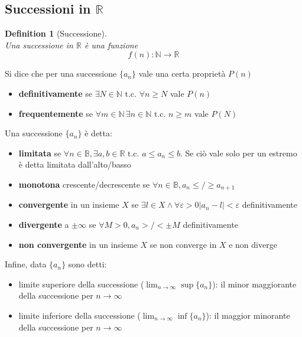 \documentclass{article}
\newtheorem{definition}{Definition}[section]
\begin{document}
    \subsection{Successioni in $\mathbb{R}$}
        \begin{definition}[Successione]
            \, \\ Una successione in $\mathbb{R}$ è una funzione 
            $$f\left(n\right): \mathbb{N} \to \mathbb{R}$$
        \end{definition}
        Si dice che per una successione $\{a_n\}$ vale una certa proprietà $P\left(n\right)$
        \begin{itemize}
            \item \textbf{definitivamente} se $\exists N \in \mathbb{N} \textrm{ t.c. } \forall n \geq N$ vale $P\left(n\right)$
            \item \textbf{frequentemente} se $\forall m \in \mathbb{N} \, \exists n \in \mathbb{N} \textrm{ t.c. } n \geq m$ vale $P\left(N\right)$
        \end{itemize}
        Una successione $\{a_n\}$ è detta:
        \begin{itemize}
            \item \textbf{limitata} se $\forall n \in \mathbb{B}, \exists a, b \in \mathbb{R} \textrm{ t.c. } a \leq a_n \leq b$. Se ciò vale
                solo per un estremo è detta limitata dall'alto/basso
            \item \textbf{monotona} crescente/decrescente se $\forall n \in \mathbb{B}, a_n \leq/\geq a_{n+1}$
            \item \textbf{convergente} in un insieme ${X}$ se $\exists l \in X \land \forall \varepsilon > 0 |a_n - l| < \varepsilon$ definitivamente
            \item \textbf{divergente} a $\pm \infty$ se $\forall M > 0, a_n >/< \pm M$ definitivamente 
            \item \textbf{non convergente} in un insieme $X$ se non converge in $X$ e non diverge
        \end{itemize}
        Infine, data $\{a_n\}$ sono detti:
        \begin{itemize}
            \item limite superiore della successione ($\lim_{n \to \infty} \sup \{a_n\}$): il minor maggiorante della successione per $n \to \infty$
            \item limite inferiore della successione ($\lim_{n \to \infty} \inf \{a_n\}$): il maggior minorante della successione per $n \to \infty$
        \end{itemize}
\end{document}
